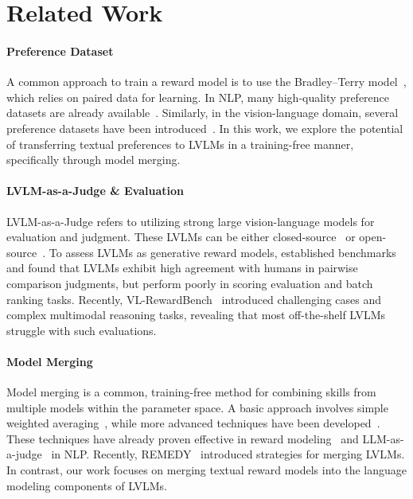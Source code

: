 \section{Related Work}
\label{sec:related_work}
\paragraph{Preference Dataset} A common approach to train a reward model is to use the Bradley–Terry model~\citep{bradley1952rank}, which relies on paired data for learning. In NLP, many high-quality preference datasets are already available~\citep{learningtosummarize,bai2022traininghelpfulharmlessassistant,pmlr-v162-ethayarajh22a,oasst,cui2024ultrafeedback,zhu2024starlingb,wang2024helpsteer}. Similarly, in the vision-language domain, several preference datasets have been introduced~\citep{Yu_2024_CVPR,yu2024rlaifv,chen2024sharegpt4v,wijaya2024multimodalpreferencedatasynthetic,li2024vlfeedback,zhou2024aligning,xiao2024detecting}. In this work, we explore the potential of transferring textual preferences to LVLMs in a training-free manner, specifically through model merging.

\vspace{-3pt}
\paragraph{LVLM-as-a-Judge \& Evaluation} LVLM-as-a-Judge refers to utilizing strong large vision-language models for evaluation and judgment. These LVLMs can be either closed-source~\citep{openai2023gpt4v,hurst2024gpt,team2024gemini,anthropic2024claude35} or open-source~\citep{lee-etal-2024-prometheus,dubey2024llama,deitke2024molmo,Qwen2.5-VL}. To assess LVLMs as generative reward models, \citet{chen2024mllmasajudge} established benchmarks and found that LVLMs exhibit high agreement with humans in pairwise comparison judgments, but perform poorly in scoring evaluation and batch ranking tasks. Recently, VL-RewardBench~\citep{li2024vlrewardbench} introduced challenging cases and complex multimodal reasoning tasks, revealing that most off-the-shelf LVLMs struggle with such evaluations.

\vspace{-3pt}
\paragraph{Model Merging} Model merging is a common, training-free method for combining skills from multiple models within the parameter space. A basic approach involves simple weighted averaging~\citep{wortsman2022model}, while more advanced techniques have been developed~\citep{yadav2024ties,yu2024language,yang2024modelmergingllmsmllms}. These techniques have already proven effective in reward modeling~\citep{rame2024warm,lin-etal-2024-dogerm} and LLM-as-a-judge~\citep{kim-etal-2024-prometheus} in NLP. Recently, REMEDY~\citep{zhu2025remedy} introduced strategies for merging LVLMs. In contrast, our work focuses on merging textual reward models into the language modeling components of LVLMs.
